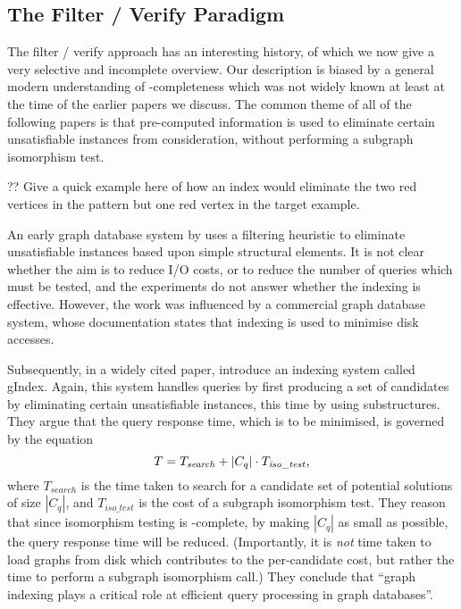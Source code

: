 \documentclass[twoside,11pt]{article}
\newcommand{\citet}[1]{\citeA{#1}}
\begin{document}
\subsection{The Filter / Verify Paradigm}

The filter / verify approach has an interesting history, of which we now give a very selective and
incomplete overview. Our description is biased by a general modern understanding of \NP-completeness
which was not widely known at least at the time of the earlier papers we discuss. The common theme
of all of the following papers is that pre-computed information is used to eliminate certain
unsatisfiable instances from consideration, without performing a subgraph isomorphism test.

?? Give a quick example here of how an index would eliminate the two red vertices in the pattern but
one red vertex in the target example.

An early graph database system by \citet{DBLP:conf/pods/ShashaWG02} uses a filtering heuristic to
eliminate unsatisfiable instances based upon simple structural elements. It is not clear whether the
aim is to reduce I/O costs, or to reduce the number of queries which must be tested, and the
experiments do not answer whether the indexing is effective. However, the work was influenced by a commercial
graph database system, whose documentation \cite[section 7.1]{Daylight} states that indexing is
used to minimise disk accesses.

Subsequently, in a widely cited paper, \citet{DBLP:conf/sigmod/YanYH04} introduce an indexing system
called gIndex. Again, this system handles queries by first producing a set of candidates by
eliminating certain unsatisfiable instances, this time by using substructures. They argue that the
query response time, which is to be minimised, is governed by the equation \[ T =
T_{\mathit{search}} + \left|C_q\right| \cdot T_{\mathit{iso\_test}} \textnormal{,}\] where
$T_{\mathit{search}}$ is the time taken to search for a candidate set of potential solutions of size
$\left|C_q\right|$, and $T_{\mathit{iso\_test}}$ is the cost of a subgraph isomorphism test. They
reason that since isomorphism testing is \NP-complete, by making $\left|C_q\right|$ as small as
possible, the query response time will be reduced.  (Importantly, it is \emph{not} time taken to
load graphs from disk which contributes to the per-candidate cost, but rather the time to perform a
subgraph isomorphism call.) They conclude that ``graph indexing plays a critical role at efficient
query processing in graph databases''.
\end{document}
